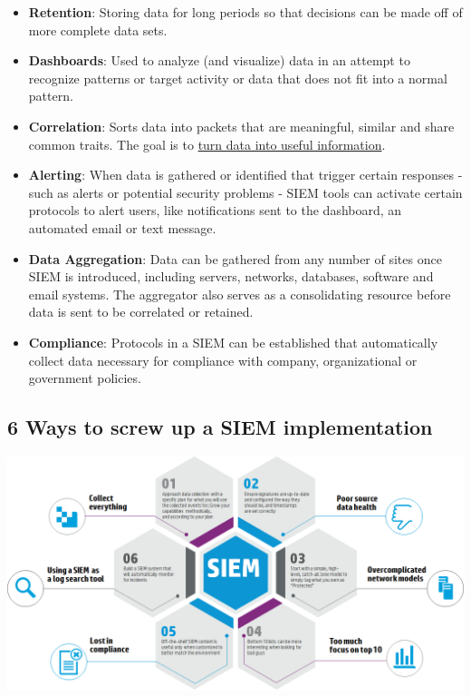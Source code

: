 \documentclass[8pt]{extarticle}
\begin{document}
\begin{multicols}{3}
\begin{itemize}
    \item \textbf{Retention}: Storing data for long periods so that decisions can be made off of more
    complete data sets.
    \item \textbf{Dashboards}: Used to analyze (and visualize) data in an attempt to recognize patterns
    or target activity or data that does not fit into a normal pattern.
    \item \textbf{Correlation}: Sorts data into packets that are meaningful, similar and share common
    traits. The goal is to \underline{turn data into useful information}.
    \item \textbf{Alerting}: When data is gathered or identified that trigger certain responses - such as
    alerts or potential security problems - SIEM tools can activate certain protocols to alert
    users, like notifications sent to the dashboard, an automated email or text message.
    \item \textbf{Data Aggregation}: Data can be gathered from any number of sites once SIEM is
    introduced, including servers, networks, databases, software and email systems. The
    aggregator also serves as a consolidating resource before data is sent to be
    correlated or retained.
    \item \textbf{Compliance}: Protocols in a SIEM can be established that automatically collect data
    necessary for compliance with company, organizational or government policies.
\end{itemize}

\subsection{6 Ways to screw up a SIEM implementation}
\begin{center}
    \begin{minipage}{\columnwidth}
        \includegraphics[width=\columnwidth]{screw-up-SIEM.png}
    \end{minipage}
\end{center}


\end{multicols}
\end{document}
